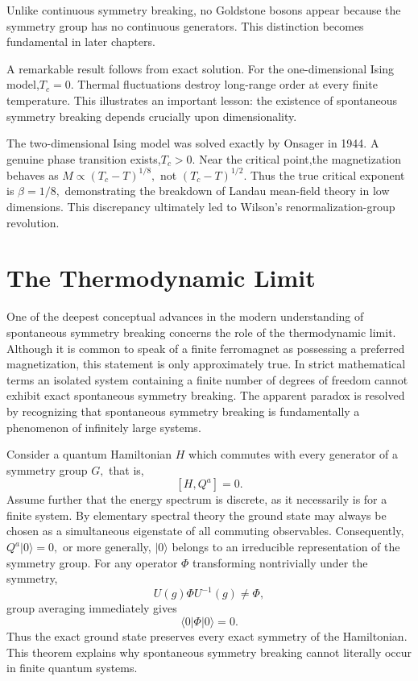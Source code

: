 Unlike continuous symmetry breaking,
no Goldstone bosons appear because the symmetry group has no continuous
generators.
This distinction becomes fundamental in later chapters.

A remarkable result follows from exact solution.
For the one-dimensional Ising model,$T_c=0.$
Thermal fluctuations destroy long-range order at every finite
temperature.
This illustrates an important lesson:
the existence of spontaneous symmetry breaking depends crucially upon
dimensionality.

The two-dimensional Ising model was solved exactly by Onsager in 1944.
A genuine phase transition exists,$T_c>0.$
Near the critical point,the magnetization behaves as
$M \propto (T_c-T)^{1/8},$ not $(T_c-T)^{1/2}.$
Thus the true critical exponent is $\beta=1/8,$
demonstrating the breakdown of Landau mean-field theory in low
dimensions.
This discrepancy ultimately led to Wilson's renormalization-group
revolution.

\section{The Thermodynamic Limit}
\label{sec:thermodynamic_limit}
One of the deepest conceptual advances in the modern understanding of
spontaneous symmetry breaking concerns the role of the thermodynamic
limit.
Although it is common to speak of a finite ferromagnet as possessing a
preferred magnetization, this statement is only approximately true. In
strict mathematical terms an isolated system containing a finite number
of degrees of freedom cannot exhibit exact spontaneous symmetry
breaking.
The apparent paradox is resolved by recognizing that spontaneous
symmetry breaking is fundamentally a phenomenon of infinitely large
systems.

Consider a quantum Hamiltonian $H$ which commutes with every generator of
a symmetry group $G,$ that is,
\[[H,Q^a]=0.\]
Assume further that the energy spectrum is discrete, as it necessarily
is for a finite system.
By elementary spectral theory the ground state may always be chosen as a
simultaneous eigenstate of all commuting observables.
Consequently,$Q^a|0\rangle=0,$ or more generally, $|0\rangle $
belongs to an irreducible representation of the symmetry group.
For any operator $\Phi$ transforming nontrivially under the symmetry,
\[U(g)\Phi U^{-1}(g) \neq \Phi,\]
group averaging immediately gives
\[\boxed{\langle0|\Phi|0\rangle=0.}\]
Thus the exact ground state preserves every exact symmetry of the
Hamiltonian.
This theorem explains why spontaneous symmetry breaking cannot literally
occur in finite quantum systems.

